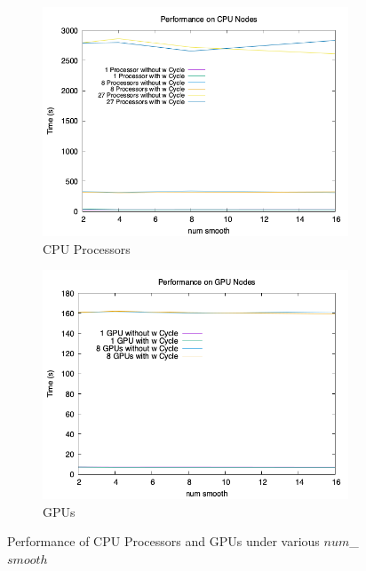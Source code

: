 \documentclass{article}
\begin{document}
\begin{figure}[H]
    \begin{subfigure}{0.92\textwidth}
        \includegraphics[width=\textwidth]{Performance on CPU Nodes.png}
        \caption{CPU Processors}
        \label{fig:Performance on CPU Nodes}
    \end{subfigure}
    \begin{subfigure}[b]{0.92\textwidth}
        \includegraphics[width=\textwidth]{Performance on GPU Nodes.png}
        \caption{GPUs}
        \label{fig:Performance on GPU Nodes}
    \end{subfigure}
    \caption{Performance of CPU Processors and GPUs under various $num$\_$smooth$}
\end{figure}
\end{document}
